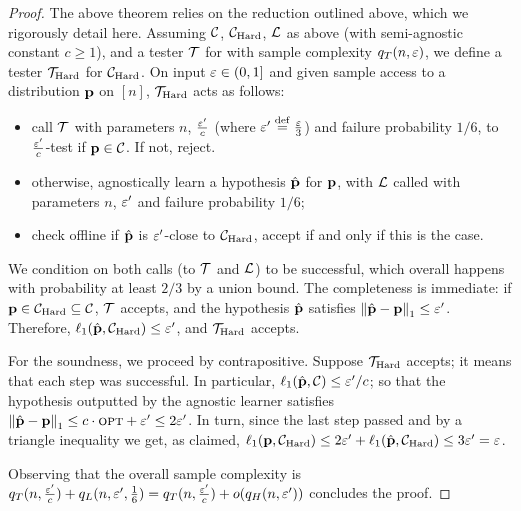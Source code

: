 \begin{proof}
The above theorem relies on the reduction outlined above, which we rigorously detail here. Assuming $\class$, $\class_{\rm Hard}$, $\Learner$ as above (with semi-agnostic constant $c \geq 1$), and a tester $\Tester$ for \class with sample complexity $q_T(n,\eps)$, we define a tester $\Tester_{\rm Hard}$ for $\class_{\rm Hard}$. On input $\eps\in(0,1]$ and given sample access to a distribution $\D$ on $[n]$, $\Tester_{\rm Hard}$ acts as follows:
\begin{itemize}
  \item call $\Tester$ with parameters $n$, $\frac{\eps^\prime}{c}$ (where $\eps^\prime\eqdef\frac{\eps}{3}$) and failure probability $1/6$, to $\frac{\eps^\prime}{c}$-test if $\D\in\class$. If not, reject.
  \item otherwise, agnostically learn a hypothesis $\hat{\D}$ for $\D$, with $\Learner$ called with parameters $n$, $\eps^\prime$ and failure probability $1/6$;
  \item check offline if $\hat{\D}$ is $\eps^\prime$-close to $\class_{\rm Hard}$, accept if and only if this is the case.
\end{itemize} 
We condition on both calls (to $\Tester$ and $\Learner$) to be successful, which overall happens with probability at least $2/3$ by a union bound. The completeness is immediate: if $\D\in\class_{\rm Hard}\subseteq\class$, $\Tester$ accepts, and the hypothesis $\hat{\D}$ satisfies $\normone{\hat{\D}-\D} \leq \eps^\prime$. Therefore, $\lp[1](\hat{\D},\class_{\rm Hard}) \leq \eps^\prime$, and $\Tester_{\rm Hard}$ accepts.

For the soundness, we proceed by contrapositive. Suppose $\Tester_{\rm Hard}$ accepts; it means that each step was successful. In particular, $\lp[1](\hat{\D},\class)\leq {\eps^\prime}/{c}$; so that the hypothesis outputted by the agnostic learner satisfies $\normone{\hat{\D}-\D} \leq c\cdot\opt+\eps^\prime\leq 2\eps^\prime$. In turn, since the last step passed and by a triangle inequality  we get, as claimed, $\lp[1](\D, \class_{\rm Hard}) \leq 2\eps^\prime + \lp[1](\hat{\D},\class_{\rm Hard}) \leq 3\eps^\prime = \eps$.

Observing that the overall sample complexity is $q_T(n,\frac{\eps^\prime}{c})+q_L(n,\eps^\prime, \frac{1}{6}) = q_T(n,\frac{\eps^\prime}{c})+\littleO{q_H(n,\eps^\prime)}$ concludes the proof.
\end{proof}

